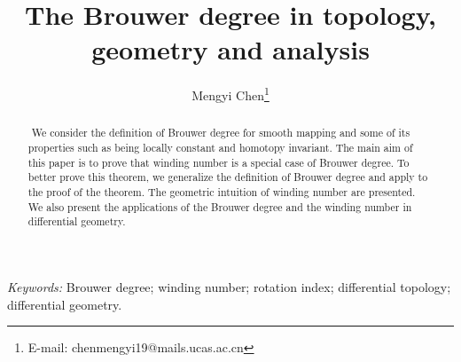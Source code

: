 \documentclass[11pt]{article}
\numberwithin{equation}{section} \numberwithin{theorem}{section}
\numberwithin{lemma}{section} \numberwithin{remark}{section}
\numberwithin{table}{section} \numberwithin{corollary}{section}
\numberwithin{example}{section} \numberwithin{conjecture}{section}
\numberwithin{assumption}{section}
\numberwithin{definition}{section}
\numberwithin{proposition}{section}
\begin{document}
\title{The Brouwer degree in topology, geometry and analysis}

\author[1]{Mengyi Chen\thanks{E-mail: chenmengyi19@mails.ucas.ac.cn}}

\maketitle
\begin{abstract}



​    We consider the definition of Brouwer degree for smooth mapping and some of its properties such as being locally constant and homotopy invariant. The main aim of this paper is to prove that winding number is a special case of Brouwer degree. To better prove this theorem, we generalize the definition of Brouwer degree and apply to the proof of the theorem. The geometric intuition of winding number are presented. 
​    We also present the applications of the Brouwer degree and the winding number in differential geometry.
\end{abstract}

\emph{Keywords:}
Brouwer degree; winding number; rotation index; differential topology; differential geometry.
\end{document}
